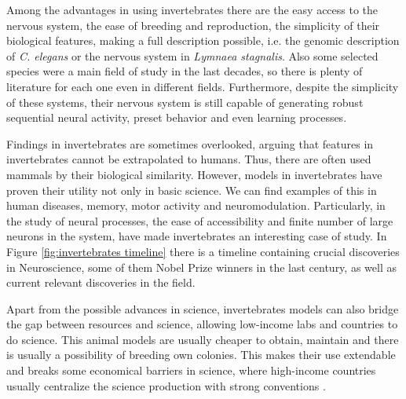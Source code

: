 
Among the advantages in using invertebrates there are the easy access to the nervous system, the ease of breeding and reproduction, the simplicity of their biological features, making a full description possible, i.e. the genomic description of \textit{C. elegans} or the nervous system in \textit{Lymnaea stagnalis}. Also some selected species were a main field of study in the last decades, so there is plenty of literature for each one even in different fields. Furthermore, despite the simplicity of these systems, their nervous system is still capable of generating robust sequential neural activity, preset behavior and even learning processes. 

Findings in invertebrates are sometimes overlooked, arguing that features in invertebrates cannot be extrapolated to humans. Thus, there are often used mammals by their biological similarity. However, models in invertebrates have proven their utility not only in basic science. We can find examples of this in human diseases, memory, motor activity and neuromodulation. Particularly, in the study of neural processes, the ease of accessibility and finite number of large neurons in the system, have made invertebrates an interesting case of study. In Figure \ref{fig:invertebrates timeline} there is a timeline containing crucial discoveries in Neuroscience, some of them Nobel Prize winners in the last century, as well as current relevant discoveries in the field. 

Apart from the possible advances in science, invertebrates models can also bridge the gap between resources and science, allowing low-income labs and countries to do science. This animal models are usually cheaper to obtain, maintain and there is usually a possibility of breeding own colonies. This makes their use extendable and breaks some economical barriers in science, where high-income countries usually centralize the science production with strong conventions \parencite{castillo_spineless_2017,stephan_how_2015}. 

